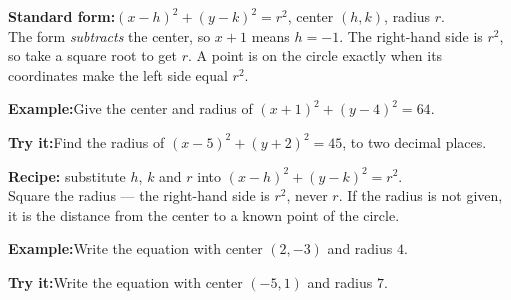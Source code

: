 \documentclass[12pt]{article}
\begin{document}

\begin{formulabox}\textbf{Standard form:}\quad $(x-h)^2 + (y-k)^2 = r^2$, center $(h, k)$, radius $r$.\\[4pt]
The form \emph{subtracts} the center, so $x + 1$ means $h = -1$. The right-hand side is
$r^2$, so take a square root to get $r$. A point is on the circle exactly when its
coordinates make the left side equal $r^2$.
\end{formulabox}
\begin{examplebox}\textbf{Example:}\quad Give the center and radius of $(x+1)^2 + (y-4)^2 = 64$.
\end{examplebox}
\begin{tryitbox}\textbf{Try it:}\quad Find the radius of $(x-5)^2 + (y+2)^2 = 45$, to two
decimal places.\\[2pt]
\end{tryitbox}

\begin{formulabox}\textbf{Recipe:} substitute $h$, $k$ and $r$ into $(x-h)^2 + (y-k)^2 = r^2$.\\[4pt]
Square the radius --- the right-hand side is $r^2$, never $r$. If the radius is not given,
it is the distance from the center to a known point of the circle.
\end{formulabox}
\begin{examplebox}\textbf{Example:}\quad Write the equation with center $(2, -3)$ and radius $4$.
\end{examplebox}
\begin{tryitbox}\textbf{Try it:}\quad Write the equation with center $(-5, 1)$ and radius $7$.\\[2pt]
\end{tryitbox}
\end{document}
